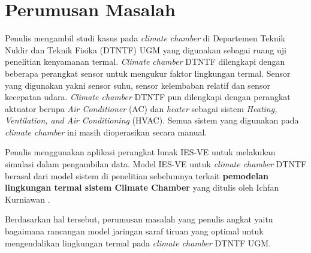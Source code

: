 
\section{Perumusan Masalah}
Penulis mengambil studi kasus pada \textit{climate chamber} di Departemen Teknik Nuklir dan Teknik Fisika (DTNTF) UGM yang digunakan sebagai ruang uji penelitian kenyamanan termal. \textit{Climate chamber} DTNTF dilengkapi dengan beberapa perangkat sensor untuk mengukur faktor lingkungan termal. Sensor yang digunakan yakni sensor suhu, sensor kelembaban relatif dan sensor kecepatan udara. \textit{Climate chamber} DTNTF pun dilengkapi dengan perangkat aktuator berupa \textit{Air Conditioner} (AC) dan \textit{heater} sebagai sistem \textit{Heating, Ventilation, and Air Conditioning} (HVAC). Semua sistem yang digunakan pada \textit{climate chamber} ini masih dioperasikan secara manual.

Penulis menggunakan aplikasi perangkat lunak IES-VE untuk melakukan simulasi dalam pengambilan data. Model IES-VE untuk \textit{climate chamber} DTNTF berasal dari model sistem di penelitian sebelumnya terkait \textbf{pemodelan lingkungan termal sistem Climate Chamber} yang ditulis oleh Ichfan Kurniawan \cite{skripsiIchfan}.

Berdasarkan hal tersebut, perumusan masalah yang penulis angkat yaitu bagaimana rancangan model jaringan saraf tiruan yang optimal untuk mengendalikan lingkungan termal pada \textit{climate chamber} DTNTF UGM.

